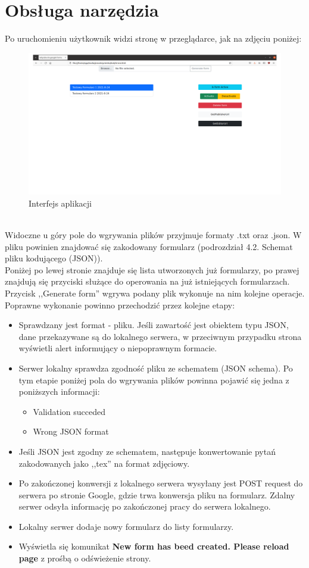 \section{Obsługa narzędzia}
Po uruchomieniu użytkownik widzi stronę w przeglądarce, jak na zdjęciu poniżej:
\begin{figure}
  \includegraphics{strona.png}
  \caption{Interfejs aplikacji}
  \label{fig:1}
\end{figure}
\\Widoczne u góry pole do wgrywania plików przyjmuje formaty .txt oraz .json. W pliku powinien znajdować się zakodowany formularz (podrozdział 4.2. Schemat pliku kodującego (JSON)).
\\Poniżej  po lewej stronie znajduje się lista utworzonych już formularzy, po prawej znajdują się przyciski służące do operowania na już istniejących formularzach.
\\Przycisk ,,Generate form'' wgrywa podany plik wykonuje na nim kolejne operacje. Poprawne wykonanie powinno przechodzić przez kolejne etapy:
\begin{itemize}
\item Sprawdzany jest format -  pliku. Jeśli zawartość jest obiektem typu JSON, dane przekazywane są do lokalnego serwera, w przeciwnym przypadku strona wyświetli alert informujący o niepoprawnym formacie.
\item Serwer lokalny sprawdza zgodność pliku ze schematem (JSON schema). Po tym etapie poniżej pola do wgrywania plików powinna pojawić się jedna z poniższych informacji:
\begin{itemize}
\item Validation succeded
\item Wrong JSON format
\end{itemize}
\item Jeśli JSON jest zgodny ze schematem, następuje konwertowanie pytań zakodowanych jako ,,tex'' na format zdjęciowy. 
\item Po zakończonej konwersji z lokalnego serwera wysyłany jest POST request do serwera po stronie Google, gdzie trwa konwersja pliku na formularz. Zdalny serwer odsyła informację po zakończonej pracy do serwera lokalnego.
\item Lokalny serwer dodaje nowy formularz do listy formularzy.
\item Wyświetla się komunikat \textbf{New form has beed created. Please reload page} z prośbą o odświeżenie strony.
\end{itemize}
